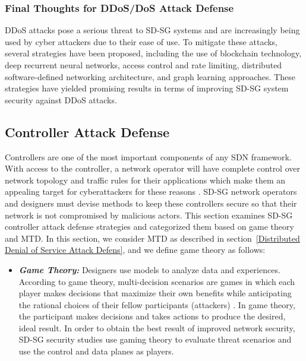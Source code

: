 \documentclass[conference]{IEEEtran}
\begin{document}
\subsubsection{Final Thoughts for DDoS/DoS Attack Defense}
DDoS attacks pose a serious threat to SD-SG systems and are increasingly being used by cyber attackers due to their ease of use. To mitigate these attacks, several strategies have been proposed, including the use of blockchain technology, deep recurrent neural networks, access control and rate limiting, distributed software-defined networking architecture, and graph learning approaches. These strategies have yielded promising results in terms of improving SD-SG system security against DDoS attacks.


\subsection{Controller Attack Defense}
\label{controller attack defense}
Controllers are one of the most important components of any SDN framework. With access to the controller, a network operator will have complete control over network topology and traffic rules for their applications which make them an appealing target for cyberattackers for these reasons \cite{zainudin2022towards}. SD-SG network operators and designers must devise methods to keep these controllers secure so that their network is not compromised by malicious actors. This section examines SD-SG controller attack defense strategies and categorized them based on game theory and MTD. In this section, we consider MTD as described in section~\ref{Distributed Denial of Service Attack Defens}, and we define game theory as follows:
\begin{itemize}
    \item \textbf{\emph{Game Theory:}} Designers use models to analyze data and experiences. According to game theory, multi-decision scenarios are games in which each player makes decisions that maximize their own benefits while anticipating the rational choices of their fellow participants (attackers) \cite{rathore2022review}. In game theory, the participant makes decisions and takes actions to produce the desired, ideal result.  In order to obtain the best result of improved network security, SD-SG security studies use gaming theory to evaluate threat scenarios and use the control and data planes as players.
    
\end{itemize}
\end{document}
